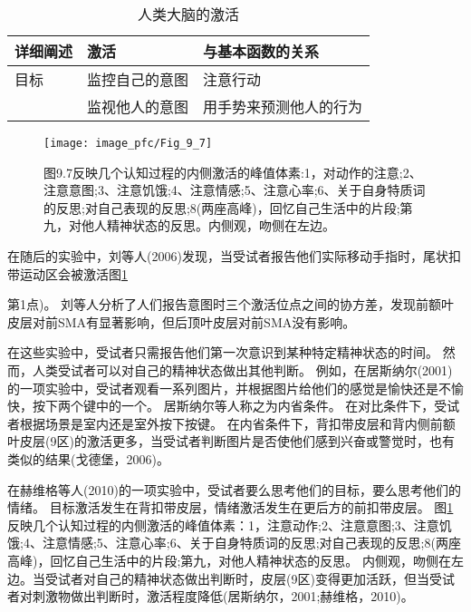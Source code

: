 \begin{table}[htbp] 
	\newcommand{\tabincell}[2]{\begin{tabular}{@{}#1@{}}#2\end{tabular}} %
	\centering
	\caption{人类大脑的激活\label{tab:9_4}}
	\renewcommand\arraystretch{1.5}	%
	\begin{tabular}{lll}
		\toprule
		详细阐述 & 激活 & 与基本函数的关系\\
		\midrule
		目标 & 监控自己的意图 & 注意行动  \\
		& 监视他人的意图 & 用手势来预测他人的行为 \\
		\bottomrule
		
	\end{tabular}%
\end{table}%


\begin{figure}[!htb]
	\centering
	\texttt{[image: image\_pfc/Fig\_9\_7]}
	\caption{图9.7反映几个认知过程的内侧激活的峰值体素:1，对动作的注意;2、注意意图;3、注意饥饿;4、注意情感;5、注意心率;6、关于自身特质词的反思;对自己表现的反思;8(两座高峰)，回忆自己生活中的片段;第九，对他人精神状态的反思。内侧观，吻侧在左边。\label{fig:fig_9_7}}
\end{figure}

\par


在随后的实验中，刘等人(2006)发现，当受试者报告他们实际移动手指时，尾状扣带运动区会被激活图\ref{fig:fig_9_7}

第1点)。
刘等人分析了人们报告意图时三个激活位点之间的协方差，发现前额叶皮层对前SMA有显著影响，但后顶叶皮层对前SMA没有影响。
\par


在这些实验中，受试者只需报告他们第一次意识到某种特定精神状态的时间。
然而，人类受试者可以对自己的精神状态做出其他判断。
例如，在居斯纳尔(2001)的一项实验中，受试者观看一系列图片，并根据图片给他们的感觉是愉快还是不愉快，按下两个键中的一个。
居斯纳尔等人称之为内省条件。
在对比条件下，受试者根据场景是室内还是室外按下按键。
在内省条件下，背扣带皮层和背内侧前额叶皮层(9区)的激活更多，当受试者判断图片是否使他们感到兴奋或警觉时，也有类似的结果(戈德堡，2006)。
\par


在赫维格等人(2010)的一项实验中，受试者要么思考他们的目标，要么思考他们的情绪。
目标激活发生在背扣带皮层，情绪激活发生在更后方的前扣带皮层。
图\ref{fig:fig_9_7}反映几个认知过程的内侧激活的峰值体素：1，注意动作;2、注意意图;3、注意饥饿;4、注意情感;5、注意心率;6、关于自身特质词的反思;对自己表现的反思;8(两座高峰)，回忆自己生活中的片段;第九，对他人精神状态的反思。
内侧观，吻侧在左边。当受试者对自己的精神状态做出判断时，皮层(9区)变得更加活跃，但当受试者对刺激物做出判断时，激活程度降低(居斯纳尔，2001;赫维格，2010)。




